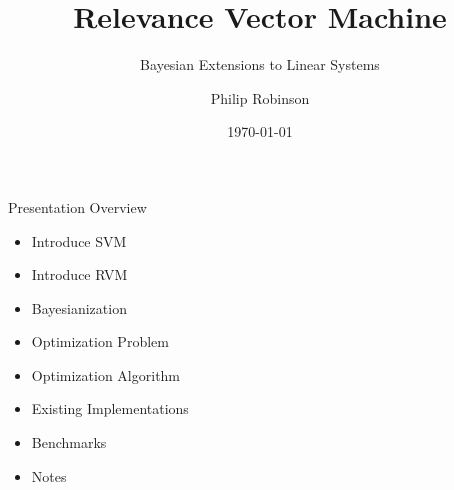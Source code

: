 \documentclass[10pt]{beamer}
\title{Relevance Vector Machine}
\subtitle{Bayesian Extensions to Linear Systems}
\author{Philip Robinson}
\date{\today}
\institute{Presented to \\ OHSU - Machine Learning Class}
\begin{document}
\begin{frame}
  \titlepage
\end{frame}


\begin{frame}{Presentation Overview}

  \begin{itemize}
  \item Introduce SVM
  \item Introduce RVM
  \item Bayesianization
  \item Optimization Problem
  \item Optimization Algorithm
  \item Existing Implementations
  \item Benchmarks
  \item Notes
  \end{itemize}
\end{frame}
\end{document}
